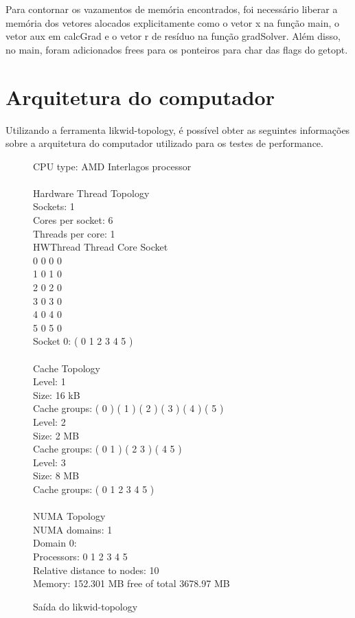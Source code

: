 \documentclass[12pt]{article}
\begin{document}
Para contornar os vazamentos de memória encontrados, foi necessário liberar a
memória dos vetores alocados explicitamente como o vetor x na função main, o
vetor aux em calcGrad e o vetor r de resíduo na função gradSolver. Além disso,
no main, foram adicionados frees para os ponteiros para char das flags do
getopt.

\section{Arquitetura do computador}\label{sec:likwid}

Utilizando a ferramenta likwid-topology, é possível obter as seguintes
informações sobre a arquitetura do computador utilizado para os testes de
performance.

\begin{figure}[ht]
\begin{tt}\noindent
CPU type:   AMD Interlagos processor \\
\\
Hardware Thread Topology\\
Sockets:    1 \\
Cores per socket:   6 \\
Threads per core:   1 \\
HWThread    Thread      Core        Socket\\
0       0       0       0\\
1       0       1       0\\
2       0       2       0\\
3       0       3       0\\
4       0       4       0\\
5       0       5       0\\
Socket 0: ( 0 1 2 3 4 5 )\\
\\
Cache Topology\\
Level:  1\\
Size:   16 kB\\
Cache groups:   ( 0 ) ( 1 ) ( 2 ) ( 3 ) ( 4 ) ( 5 )\\
Level:  2\\
Size:   2 MB\\
Cache groups:   ( 0 1 ) ( 2 3 ) ( 4 5 )\\
Level:  3\\
Size:   8 MB\\
Cache groups:   ( 0 1 2 3 4 5 )\\
\\
NUMA Topology\\
NUMA domains: 1 \\
Domain 0:\\
Processors:  0 1 2 3 4 5\\
Relative distance to nodes:  10\\
Memory: 152.301 MB free of total 3678.97 MB\\
\end{tt}\caption{Saída do likwid-topology}\label{fig:topologyOut}
\end{figure}
\end{document}
